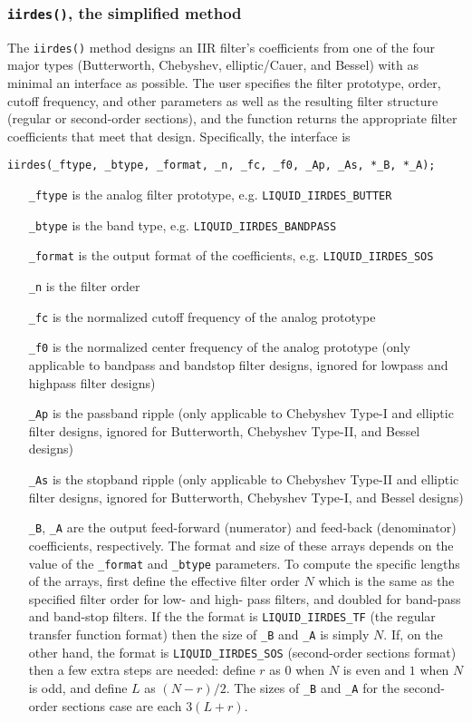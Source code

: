 \subsubsection{{\tt iirdes()}, the simplified method}
\label{module:filter:iirdes:iirdes}
The {\tt iirdes()} method designs an IIR filter's coefficients
from one of the four major types
(Butterworth, Chebyshev, elliptic/Cauer, and Bessel)
with as minimal an interface as possible.
The user specifies the filter prototype, order, cutoff frequency, and
other parameters as well as the resulting filter structure
(regular or second-order sections),
and the function returns the appropriate filter coefficients that meet
that design.
Specifically, the interface is
%
\begin{Verbatim}[fontsize=\small]
    iirdes(_ftype, _btype, _format, _n, _fc, _f0, _Ap, _As, *_B, *_A);
\end{Verbatim}
%
\begin{itemize}
\item[{\tt \_ftype}]
    is the analog filter prototype, e.g. {\tt LIQUID\_IIRDES\_BUTTER}
\item[{\tt \_btype}]
    is the band type, e.g. {\tt LIQUID\_IIRDES\_BANDPASS}
\item[{\tt \_format}]
    is the output format of the coefficients, e.g. {\tt LIQUID\_IIRDES\_SOS}
\item[{\tt \_n}]
    is the filter order
\item[{\tt \_fc}]
    is the normalized cutoff frequency of the analog prototype
\item[{\tt \_f0}]
    is the normalized center frequency of the analog prototype (only
    applicable to bandpass and bandstop filter designs, ignored for lowpass
    and highpass filter designs)
\item[{\tt \_Ap}]
    is the passband ripple (only applicable to Chebyshev Type-I and elliptic
    filter designs, ignored for Butterworth, Chebyshev Type-II, and Bessel
    designs)
\item[{\tt \_As}]
    is the stopband ripple (only applicable to Chebyshev Type-II and elliptic
    filter designs, ignored for Butterworth, Chebyshev Type-I, and Bessel
    designs)
\item[{\tt \_B}, {\tt \_A}]
    are the output feed-forward (numerator) and feed-back (denominator)
    coefficients, respectively.
    The format and size of these arrays depends on the value of the
    {\tt \_format} and {\tt \_btype} parameters.
    To compute the specific lengths of the arrays, first define the
    effective filter order $N$ which is the same as the specified filter
    order for low- and high- pass filters, and doubled for band-pass and
    band-stop filters.
    If the the format is {\tt LIQUID\_IIRDES\_TF}
    (the regular transfer function format)
    then the size of {\tt \_B} and {\tt \_A} is simply $N$.
    If, on the other hand, the format is {\tt LIQUID\_IIRDES\_SOS}
    (second-order sections format) then a few extra steps are needed:
    define $r$ as $0$ when $N$ is even and $1$ when $N$ is odd, and
    define $L$ as $(N-r)/2$.
    The sizes of {\tt \_B} and {\tt \_A} for the second-order sections
    case are each $3(L+r)$.
\end{itemize}
